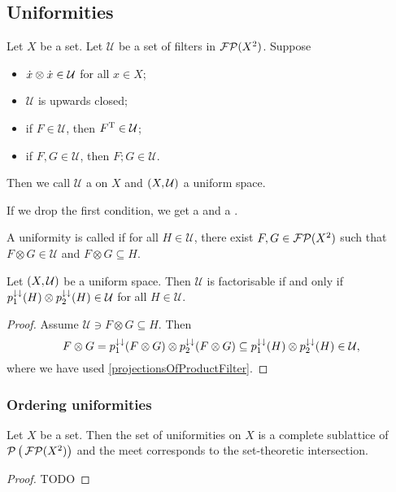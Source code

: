 \subsection{Uniformities}
\begin{definition}
Let $X$ be a set. Let $\mathcal{U}$ be a set of filters in $\operatorname{\mathcal{FP}}(X^2)$. Suppose
\begin{itemize}
\item $\dot{x}\otimes \dot{x} \in \mathcal{U}$ for all $x\in X$;
\item $\mathcal{U}$ is upwards closed;
\item if $F\in \mathcal{U}$, then $F^{\mathrm{T}}\in\mathcal{U}$;
\item if $F, G\in \mathcal{U}$, then $F;G\in\mathcal{U}$.
\end{itemize}
Then we call $\mathcal{U}$ a  on $X$ and $\left( X,\mathcal{U} \right)$ a uniform space.

If we drop the first condition, we get a  and a .

A uniformity is called  if for all $H\in\mathcal{U}$, there exist $F,G\in \operatorname{\mathcal{FP}}(X^2)$ such that $F\otimes G \in\mathcal{U}$ and $F\otimes G\subseteq H$.
\end{definition}

\begin{lemma}
Let $\left( X,\mathcal{U} \right)$ be a uniform space. Then $\mathcal{U}$ is factorisable \textup{if and only if} $p_1^{\downarrow\downarrow}(H)\otimes p_2^{\downarrow\downarrow}(H) \in \mathcal{U}$ for all $H\in\mathcal{U}$.
\end{lemma}
\begin{proof}
Assume $\mathcal{U} \ni F\otimes G \subseteq H$. Then
\[ F\otimes G = p_1^{\downarrow\downarrow}(F\otimes G)\otimes p_2^{\downarrow\downarrow}(F\otimes G) \subseteq p_1^{\downarrow\downarrow}(H)\otimes p_2^{\downarrow\downarrow}(H) \in \mathcal{U}, \]
where we have used \ref{projectionsOfProductFilter}.
\end{proof}

\subsubsection{Ordering uniformities}
\begin{proposition}
Let $X$ be a set. Then the set of uniformities on $X$ is a complete sublattice of $\operatorname{\mathcal{P}}\big(\operatorname{\mathcal{FP}}(X^2)\big)$ and the meet corresponds to the set-theoretic intersection.
\end{proposition}
\begin{proof}
TODO
\end{proof}

